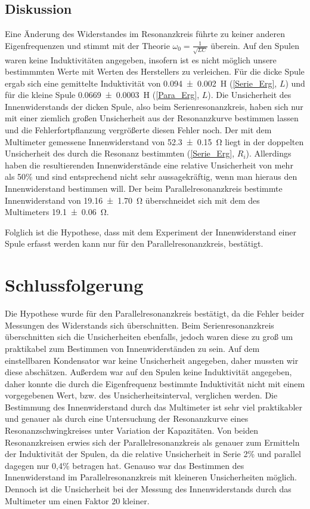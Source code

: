 \documentclass[
	a4paper,
	12pt,
	pagesize,
	ngerman
]{scrartcl}
\begin{document}
	\subsection{Diskussion}
	Eine Änderung des Widerstandes im Resonanzkreis führte zu keiner anderen Eigenfrequenzen und stimmt mit der Theorie $\omega_0 = \frac{1}{\sqrt{LC}}$ überein. %
	Auf den Spulen waren keine Induktivitäten angegeben, insofern ist es nicht möglich unsere bestimmmten Werte mit Werten des Herstellers zu verleichen.
	Für die dicke Spule ergab sich eine gemittelte Induktivität von \SI{0,094 \pm 0,002}{H} (\cref{Serie_Erg}, $L$) und für die kleine Spule \SI{0,0669 \pm 0,0003}{H} (\cref{Para_Erg}, $L$).
	Die Unsicherheit des Innenwiderstands der dicken Spule, also beim Serienresonanzkreis, haben sich nur mit einer ziemlich großen Unsicherheit aus der Resonanzkurve bestimmen lassen und die Fehlerfortpflanzung vergrößerte diesen Fehler noch.
	Der mit dem Multimeter gemessene Innenwiderstand von \SI{52,3 \pm 0,15}{\ohm} liegt in der doppelten Unsicherheit des durch die Resonanz bestimmten (\cref{Serie_Erg}, $R_i$).
	Allerdings haben die resultierenden Innenwiderstände eine relative Unsicherheit von mehr als 50\% und sind entsprechend nicht sehr aussagekräftig, wenn man hieraus den Innenwiderstand bestimmen will.
	Der beim Parallelresonanzkreis bestimmte Innenwiderstand von \SI{19.16\pm1,70}{\ohm} überschneidet sich mit dem des Multimeters \SI{19,1 \pm 0,06}{\ohm}.

	Folglich ist die Hypothese, dass mit dem Experiment der Innenwiderstand einer Spule erfasst werden kann nur für den Parallelresonanzkreis, bestätigt.
	
	\section{Schlussfolgerung}
	Die Hypothese wurde für den Parallelresonanzkreis bestätigt, da die Fehler beider Messungen des Widerstands sich überschnitten.
	Beim Serienresonanzkreis überschnitten sich die Unsicherheiten ebenfalls, jedoch waren diese zu groß um praktikabel zum Bestimmen von Innenwiderständen zu sein.
	Auf dem einstellbaren Kondensator war keine Unsicherheit angegeben, daher mussten wir diese abschätzen.
	Außerdem war auf den Spulen keine Induktivität angegeben, daher konnte die durch die Eigenfrequenz bestimmte Induktivität nicht mit einem vorgegebenen Wert, bzw. des Unsicherheitsinterval, verglichen werden.
	Die Bestimmung des Innenwiderstand durch das Multimeter ist sehr viel praktikabler und genauer als durch eine Untersuchung der Resonanzkurve eines Resonanzschwingkreises unter Variation der Kapazitäten.
	Von beiden Resonanzkreisen erwies sich der Parallelresonanzkreis als genauer zum Ermitteln der Induktivität der Spulen, da die relative Unsicherheit in Serie 2\% und parallel dagegen nur 0,4\% betragen hat.
	Genauso war das Bestimmen des Innenwiderstand im Parallelresonanzkreis mit kleineren Unsicherheiten möglich.
	Dennoch ist die Unsicherheit bei der Messung des Innenwiderstands durch das Multimeter um einen Faktor 20 kleiner.
	
	
	\printbibliography
\end{document}
